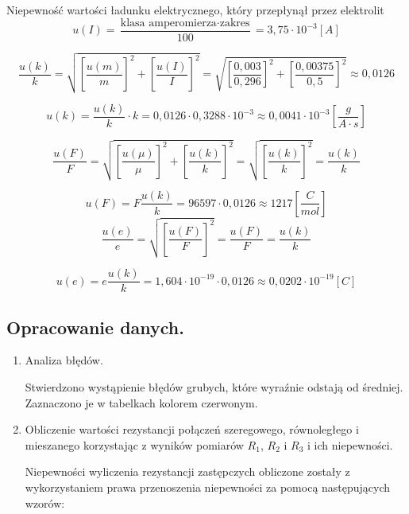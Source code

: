 \documentclass [a4paper,11pt]{article}
\begin{document}
 	
 	Niepewność wartości ładunku elektrycznego, który przepłynął przez elektrolit
 	\begin{equation}
 	u(I) = \frac{\text{klasa amperomierza} \cdot \text{zakres}}{100} = 3,75 \cdot 10^{-3} [A]
 	\end{equation}
 	

 	

 	\begin{equation}
 	\frac{u(k)}{k} = \sqrt{\left[\frac{u(m)}{m} \right]^2 + \left[\frac{u(I)}{I} \right]^2 } = \sqrt{\left[\frac{ 0,003}{0,296} \right]^2 + \left[\frac{0,00375}{0,5} \right]^2 } \approx 0,0126
 	\end{equation}
 	
 	\begin{equation}
 	u(k) = \frac{u(k)}{k} \cdot k =  0,0126 \cdot 0,3288 \cdot 10^{-3} \approx 0,0041 \cdot 10^{-3}  \left[  \frac{g}{A \cdot s}\right] 
 	\end{equation}
 	

 	\begin{equation}
 	\frac{u(F)}{F} = \sqrt{\left[\frac{u(\mu)}{\mu} \right]^2 + \left[\frac{u(k)}{k} \right]^2 } = \sqrt{\left[\frac{u(k)}{k} \right]^2 } = \frac{u(k)}{k}  
 	\end{equation}
 	
 	\begin{equation}
 	u(F) = F \frac{u(k)}{k}  =  96597  \cdot  0,0126 \approx 1217  \left[  \frac{C}{mol}\right] 
 	\end{equation}
 	\begin{equation}
 	\frac{u(e)}{e}=\sqrt{\left[\frac{u(F)}{F}\right]^2} =  \frac{u(F)}{F} =  \frac{u(k)}{k}
 	\end{equation}
 	
 	\begin{equation}
 	u(e) = e \frac{u(k)}{k}  =  1,604 \cdot 10^{-19}  \cdot  0,0126 \approx 0,0202 \cdot 10^{-19} [C] 
 	\end{equation}
 	
	
	\subsection{Opracowanie danych.}\label{sec:drm}
	\begin{enumerate}[label=\alph*)]
		
		\item Analiza błędów.
		
		Stwierdzono wystąpienie błędów grubych, które wyraźnie odstają od średniej. Zaznaczono je w tabelkach kolorem czerwonym.
		
		\item Obliczenie wartości rezystancji połączeń szeregowego, równoległego i mieszanego korzystając z wyników pomiarów $R_1$, $R_2$ i $R_3$ i ich niepewności.
		

		
		Niepewności wyliczenia rezystancji zastępczych obliczone zostały z wykorzystaniem prawa przenoszenia niepewności za pomocą następujących wzorów:

		

	
	\end{enumerate}
	
\end{document}
